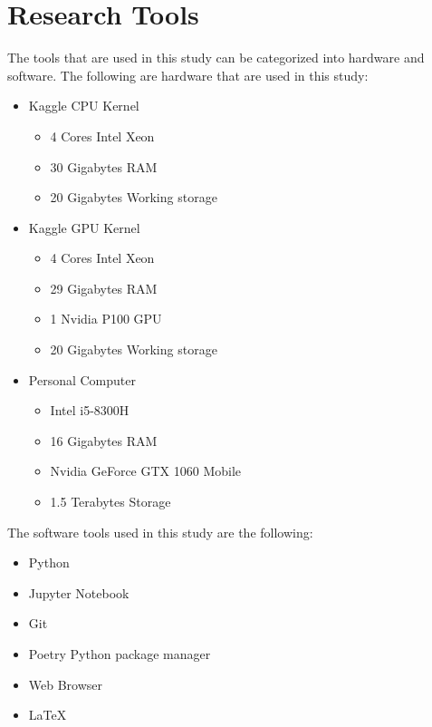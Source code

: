 \section{Research Tools}
\noindent The tools that are used in this study can be categorized into hardware and software. The following are hardware that are used in this study:
\begin{itemize}
      \item Kaggle CPU Kernel~\autocite{GettingStartedKaggle}
            \begin{itemize}
                  \item 4 Cores Intel Xeon
                  \item 30 Gigabytes RAM
                  \item 20 Gigabytes Working storage
            \end{itemize}
      \item Kaggle GPU Kernel~\autocite{GettingStartedKaggle}
            \begin{itemize}
                  \item 4 Cores Intel Xeon
                  \item 29 Gigabytes RAM
                  \item 1 Nvidia P100 GPU
                  \item 20 Gigabytes Working storage
            \end{itemize}
      \item Personal Computer
            \begin{itemize}
                  \item Intel i5-8300H
                  \item 16 Gigabytes RAM
                  \item Nvidia GeForce GTX 1060 Mobile
                  \item 1.5 Terabytes Storage
            \end{itemize}
\end{itemize}
The software tools used in this study are the following:
\begin{itemize}
      \item Python
      \item Jupyter Notebook
      \item Git
      \item Poetry Python package manager
      \item Web Browser
      \item \LaTeX{}
\end{itemize}
